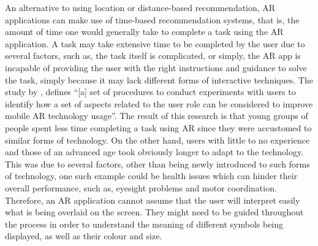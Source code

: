 \documentclass{aifyp}
\begin{document}
\indent An alternative to using location or distance-based recommendation, AR applications can make use of time-based recommendation systems, that is, the amount of time one would generally take to complete a task using the AR application. A task may take extensive time to be completed by the user due to several factors, such as, the task itself is complicated, or simply, the AR app is incapable of providing the user with the right instructions and guidance to solve the task, simply because it may lack different forms of interactive techniques. The study by \cite{8114443}, defines “[a] set of procedures to conduct experiments with users to identify how a set of aspects related to the user role can be considered to improve mobile AR technology usage”. The result of this research is that young groups of people spent less time completing a task using AR since they were accustomed to similar forms of technology. On the other hand, users with little to no experience and those of an advanced age took obviously longer to adapt to the technology. This was due to several factors, other than being newly introduced to such forms of technology, one such example could be health issues which can hinder their overall performance, such as, eyesight problems and motor coordination.
\newline
\newline
\indent Therefore, an AR application cannot assume that the user will interpret easily what is being overlaid on the screen. They might need to be guided throughout the process in order to understand the meaning of different symbols being displayed, as well as their colour and size.
\end{document}
